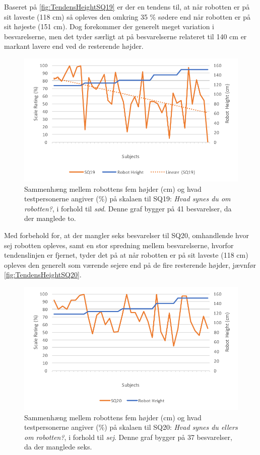 \noindent
%
Baseret på \autoref{fig:TendensHeightSQ19} er der en tendens til, at når robotten er på sit laveste (118 cm) så opleves den omkring 35 \% sødere end når robotten er på sit højeste (151 cm). Dog forekommer der generelt meget variation i besvarelserne, men det tyder særligt at på besvarelserne relateret til 140 cm er markant lavere end ved de resterende højder. 
%
\begin{figure}[H]
\centering
\includegraphics[width=\textwidth]{Figure/DatabehandlingSkalaer/TendensHeight/HeightSQ19}
\caption{Sammenhæng mellem robottens fem højder (cm) og hvad testpersonerne angiver (\%) på skalaen til SQ19: \textit{Hvad synes du om robotten?}, i forhold til \textit{sød}. Denne graf bygger på 41 besvarelser, da der manglede to.}
\label{fig:TendensHeightSQ19}
\end{figure}
\noindent
%
Med forbehold for, at der mangler seks besvarelser til SQ20, omhandlende hvor sej robotten opleves, samt en stor spredning mellem besvarelserne, hvorfor tendenslinjen er fjernet, tyder det på at når robotten er på sit laveste (118 cm) opleves den generelt som værende sejere end på de fire resterende højder, jævnfør \autoref{fig:TendensHeightSQ20}.
%
\begin{figure}[H]
\centering
\includegraphics[width=\textwidth]{Figure/DatabehandlingSkalaer/TendensHeight/HeightSQ20}
\caption{Sammenhæng mellem robottens fem højder (cm) og hvad testpersonerne angiver (\%) på skalaen til SQ20: \textit{Hvad synes du ellers om robotten?}, i forhold til \textit{sej}. Denne graf bygger på 37 besvarelser, da der manglede seks.}
\label{fig:TendensHeightSQ20}
\end{figure}
\noindent
%
